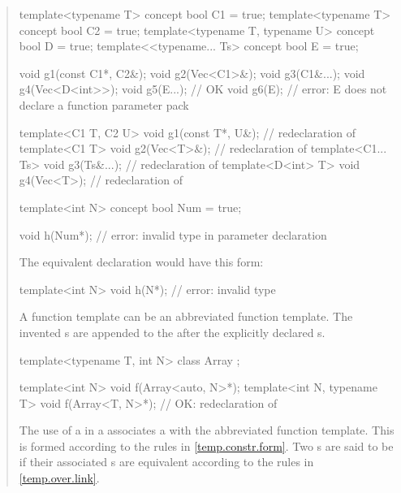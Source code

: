 \begin{quote}
\begin{codeblock}
template<typename T> concept bool C1 = true;
template<typename T> concept bool C2 = true;
template<typename T, typename U> concept bool D = true;
template<<typename... Ts> concept bool E = true;

void g1(const C1*, C2&);
void g2(Vec<C1>&);
void g3(C1&...);
void g4(Vec<D<int>>);
void g5(E...); // OK
void g6(E);    // error: E does not declare a function parameter pack

template<C1 T, C2 U> void g1(const T*, U&); // redeclaration of 
template<C1 T> void g2(Vec<T>&);            // redeclaration of 
template<C1... Ts> void g3(Ts&...);         // redeclaration of 
template<D<int> T> void g4(Vec<T>);         // redeclaration of 
\end{codeblock}
\exitexample

\enterexample
\begin{codeblock}
template<int N> concept bool Num = true;

void h(Num*); // error: invalid type in parameter declaration
      \end{codeblock}
The equivalent declaration would have this form:
      \begin{codeblock}
template<int N> void h(N*); // error: invalid type
\end{codeblock}
\exitexample

\pnum
A function template can be an abbreviated function template. The 
invented s are appended to the 
 after the explicitly declared 
s.

\enterexample
\begin{codeblock}
template<typename T, int N> class Array { };

template<int N> void f(Array<auto, N>*);
template<int N, typename T> void f(Array<T, N>*); // OK: redeclaration of 
\end{codeblock}
\exitexample

\pnum
The use of a  in a 
 associates a 
 with the abbreviated function template. 
% 
This  is formed according to the rules 
in \ref{temp.constr.form}.
% 
Two s are said to be 
 if their associated s are
equivalent according to the rules in \ref{temp.over.link}.



\end{quote}
